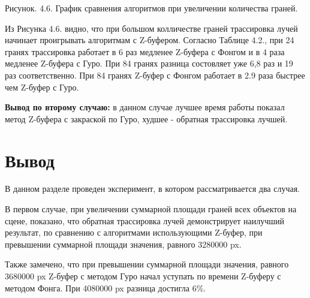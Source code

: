 \documentclass[12pt]{report}
\begin{document}
	\begin{center}
		\begin{center}
		\end{center}
		Рисунок. 4.6. График сравнения алгоритмов при увеличении количества граней.
	\end{center}

	Из Рисунка 4.6. видно, что при большом колличестве граней трассировка лучей начинает проигрывать алгоритмам с Z-буфером. Согласно Таблице 4.2., при 24 гранях трассировка работает в 6 раз медленее Z-буфера с Фонгом и в 4 раза медленее Z-буфера с Гуро. При 84 гранях разница состовляет уже 6,8 раз и 19 раз соответственно. При 84 гранях Z-буфер с Фонгом работает в 2.9 раза быстрее чем Z-буфер с Гуро.
	
	\textbf{Вывод по второму случаю:} в данном случае лучшее время работы показал метод Z-буфера с закраской по Гуро, худшее - обратная трассировка лучшей.
	\newpage
	\section*{Вывод}
	
	В данном разделе проведен эксперимент, в котором рассматривается два случая.
	
	В первом случае, при увеличении суммарной площади граней всех объектов на сцене, показано, что обратная трассировка лучей демонстрирует наилучший результат, по сравнению с алгоритмами использующими Z-буфер, при превышении суммарной площади значения, равного 3280000 px.
	
	Также замечено, что при превышении суммарной площади значения, равного 3680000 px Z-буфер с методом Гуро начал уступать по времени Z-буферу с методом Фонга. При 4080000 px разница достигла 6\%.
	
\end{document}
